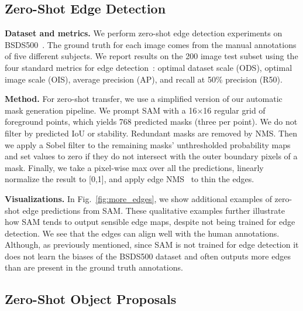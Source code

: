 \documentclass[10pt,twocolumn,letterpaper]{article}
\renewcommand{\paragraph}[1]{\vspace{1.25mm}\noindent\textbf{#1}}
\newcommand{\x}{{\times}}
\newcommand{\sam}{SAM\xspace}
\newcommand{\fig}[1]{Fig.~\ref{#1}}
\begin{document}
\subsection{Zero-Shot Edge Detection}\label{app:edges}

\paragraph{Dataset and metrics.} We perform zero-shot edge detection experiments on BSDS500~\cite{martin2001database,arbelaez2010contour}. The ground truth for each image comes from the manual annotations of five different subjects. We report results on the 200 image test subset using the four standard metrics for edge detection~\cite{arbelaez2010contour,dollar2014fast}: optimal dataset scale (ODS), optimal image scale (OIS), average precision (AP), and recall at 50\% precision (R50).

\paragraph{Method.} For zero-shot transfer, we use a simplified version of our automatic mask generation pipeline. We prompt \sam with a 16$\x$16 regular grid of foreground points, which yields 768 predicted masks (three per point). We do not filter by predicted IoU or stability. Redundant masks are removed by NMS. Then we apply a Sobel filter to the remaining masks' unthresholded probability maps and set values to zero if they do not intersect with the outer boundary pixels of a mask. Finally, we take a pixel-wise max over all the predictions, linearly normalize the result to \mbox{[0,1]}, and apply edge NMS~\cite{canny1986computational} to thin the edges.

\paragraph{Visualizations.} In \fig{fig:more_edges}, we show additional examples of zero-shot edge predictions from \sam. These qualitative examples further illustrate how \sam tends to output sensible edge maps, despite not being trained for edge detection. We see that the edges can align well with the human annotations. Although, as previously mentioned, since \sam is not trained for edge detection it does not learn the biases of the BSDS500 dataset and often outputs more edges than are present in the ground truth annotations.

\subsection{Zero-Shot Object Proposals}\label{app:proposals}
\end{document}
